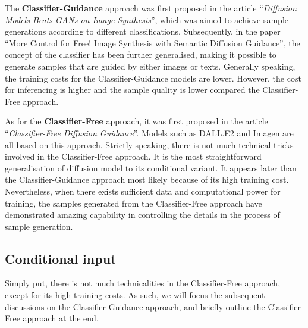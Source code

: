 The \textbf{Classifier-Guidance} approach was first proposed in the article ``\emph{Diffusion Models Beats GANs on Image Synthesis}''\cite{dhariwal2021diffusion}, which was aimed to achieve sample generations according to different classifications.  Subsequently, in the paper ``More Control for Free! Image Synthesis with Semantic Diffusion Guidance''\cite{liu2023more}, the concept of the classifier has been further generalised, making it possible to generate samples that are guided by either images or texts. Generally speaking, the training costs for the Classifier-Guidance models are lower. However, the cost for inferencing is higher and the sample quality is lower compared the Classifier-Free approach.

As for the \textbf{Classifier-Free} approach, it was first proposed in the article ``\emph{Classifier-Free Diffusion Guidance}''\cite{ho2022classifier}. Models such as DALL.E2 and Imagen are all based on this approach. Strictly speaking, there is not much technical tricks involved in the Classifier-Free approach. It is the most straightforward generalisation of diffusion model to its conditional variant. It appears later than the Classifier-Guidance approach most likely because of its high training cost. Nevertheless, when there exists sufficient data and computational power for training, the samples generated from the Classifier-Free approach have demonstrated amazing capability in controlling the details in the process of sample generation. 

\subsection{Conditional input}
Simply put, there is not much technicalities in the Classifier-Free approach, except for its high training costs. As such, we will focus the subsequent discussions on the Classifier-Guidance approach, and briefly outline the Classifier-Free approach at the end. 

